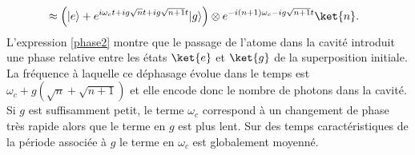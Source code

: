 {\begin{enumerate}
\begin{align}
        &\approx \left(|e\rangle + e^{i\omega_c t+i g \sqrt{n} t+i g \sqrt{n+1} t}|g\rangle\right) \otimes e^{-i(n+1)\omega_c-i g \sqrt{n+1} t} \ket{n}. \label{phase2}
    \end{align}
    L'expression \eqref{phase2} montre que le passage de l'atome dans la cavité introduit une phase relative entre les états $\ket{e}$ et $\ket{g}$ de la superposition initiale. La fréquence à laquelle ce déphasage évolue dans le temps est $\omega_c + g (\sqrt{n}+ \sqrt{n+1})$ et elle encode donc le nombre de photons dans la cavité. Si $g$ est suffisamment petit, le terme $\omega_c$ correspond à un changement de phase très rapide alors que le terme en $g$ est plus lent. Sur des temps caractéristiques de la période associée à $g$ le terme en $\omega_c$ est globalement moyenné.    










\end{enumerate}}
